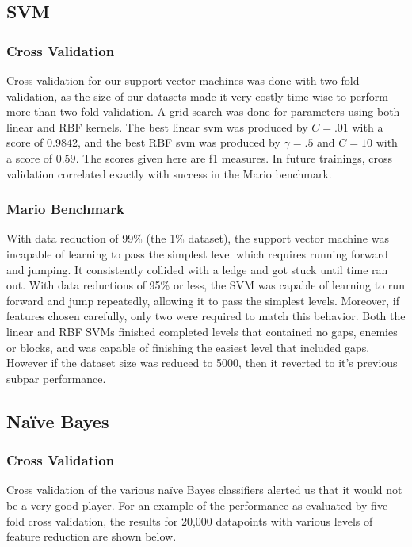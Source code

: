 \documentclass[]{article}   %
\begin{document}
\subsection{SVM}
\subsubsection{Cross Validation}
Cross validation for our support vector machines was done with two-fold validation, as the size of our datasets made 
it very costly time-wise to perform more than two-fold validation. A grid search was done for parameters using both linear
and RBF kernels. The best linear svm was produced by $C = .01$ with a score of $0.9842$, and the best RBF svm was produced by
$\gamma = .5$ and $C = 10$ with a score of $0.59$. The scores given here are f1 measures.  In future trainings, cross validation correlated exactly with success in the Mario benchmark.

\subsubsection{Mario Benchmark}
With data reduction of 99\% (the 1\% dataset), the support
vector machine was incapable of learning to pass the simplest level which requires running forward and jumping. It consistently
collided with a ledge and got stuck until time ran out. With data reductions of 95\% or less, the SVM was capable of learning to
run forward and jump repeatedly, allowing it to pass the simplest levels.  Moreover, if features chosen carefully, only two were required to match this behavior. Both the linear and RBF SVMs finished completed levels that contained no gaps, enemies or blocks, and was capable of finishing the easiest level that included gaps. However if the dataset size was reduced to 5000, then it reverted to it's previous subpar performance.

\subsection{Na\"{i}ve Bayes}
\subsubsection{Cross Validation}
Cross validation of the various na\"{i}ve Bayes classifiers alerted us that it would not be a very good player. For an example of the
performance as evaluated by five-fold cross validation, the results for 20,000 datapoints with various levels of feature reduction are
shown below.
\end{document}
